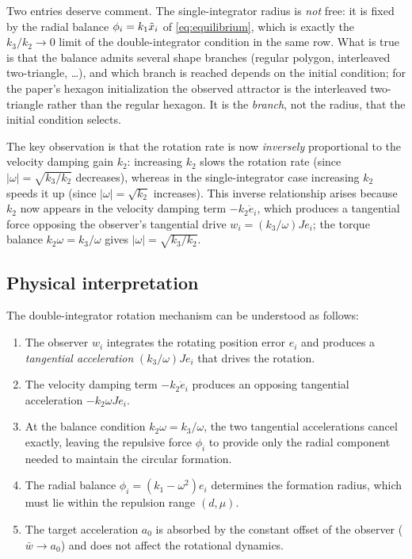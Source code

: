 Two entries deserve comment. The single-integrator radius is \emph{not} free: it is fixed by the
radial balance $\phi_i=k_1\tilde{x}_i$ of \eqref{eq:equilibrium}, which is exactly the $k_3/k_2\to0$ limit
of the double-integrator condition in the same row. What is true is that the balance admits several
shape branches (regular polygon, interleaved two-triangle, \dots), and which branch is reached
depends on the initial condition; for the paper's hexagon initialization the observed attractor is the
interleaved two-triangle rather than the regular hexagon. It is the \emph{branch}, not the radius,
that the initial condition selects.

The key observation is that the rotation rate is now \emph{inversely} proportional to the velocity
damping gain $k_2$: increasing $k_2$ slows the rotation rate (since $|\omega|=\sqrt{k_3/k_2}$
decreases), whereas in the single-integrator case increasing $k_2$ speeds it up (since
$|\omega|=\sqrt{k_2}$ increases). This inverse relationship arises because $k_2$ now appears in the velocity damping term
$-k_2\dot{e}_i$, which produces a tangential force opposing the observer's tangential drive
$w_i=(k_3/\omega)Je_i$; the torque balance $k_2\omega=k_3/\omega$ gives
$|\omega|=\sqrt{k_3/k_2}$.

\subsection{Physical interpretation}
\label{sec:double_phys}

The double-integrator rotation mechanism can be understood as follows:
\begin{enumerate}[leftmargin=2.5em]
  \item The observer $w_i$ integrates the rotating position error $e_i$ and produces a
        \emph{tangential acceleration} $(k_3/\omega)Je_i$ that drives the rotation.
  \item The velocity damping term $-k_2\dot{e}_i$ produces an opposing tangential acceleration
        $-k_2\omega Je_i$.
  \item At the balance condition $k_2\omega=k_3/\omega$, the two tangential accelerations cancel
        exactly, leaving the repulsive force $\phi_i$ to provide only the radial component needed
        to maintain the circular formation.
  \item The radial balance $\phi_i=(k_1-\omega^2)e_i$ determines the formation radius, which must
        lie within the repulsion range $(d,\mu)$.
  \item The target acceleration $a_0$ is absorbed by the constant offset of the observer
        ($\bar{w}\to a_0$) and does not affect the rotational dynamics.
\end{enumerate}

